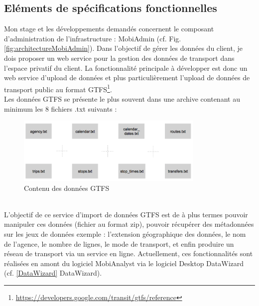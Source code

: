 \subsection{Eléments de spécifications fonctionnelles}

Mon stage et les développements demandés concernent le composant d'administration de l'infrastructure : \og MobiAdmin \fg (cf. Fig. \ref{fig:architectureMobiAdmin}). Dans l'objectif de gérer les données du client, je dois proposer un web service pour la gestion des données de transport dans l'espace privatif du client.
La fonctionnalité principale à développer est donc un web service d'upload de données et plus particulièrement l'upload de données de transport public au format GTFS\footnote{\url{https://developers.google.com/transit/gtfs/reference}}.\\ 

Les données GTFS se présente le plus souvent dans une archive contenant au minimum les 8 fichiers .txt suivants :
\\
\begin{figure}[h]
	\centering
		\includegraphics[width=0.8\textwidth]{images/GTFS_8fichiers.png}
	\caption{Contenu des données GTFS}
	\label{fig:GTFS_8fichiers}
\end{figure}\\


L'objectif de ce service d'import de données GTFS est de à plus termes pouvoir manipuler ces données (fichier au format zip), pouvoir récupérer des métadonnées sur les jeux de données exemple : l'extension géographique des données, le nom de l'agence, le nombre de lignes, le mode de transport, et enfin produire un réseau de transport via un service en ligne. Actuellement, ces fonctionnalités sont réalisées en amont du logiciel MobiAnalyst via le logiciel Desktop DataWizard (cf. \ref{DataWizard} DataWizard).\\

